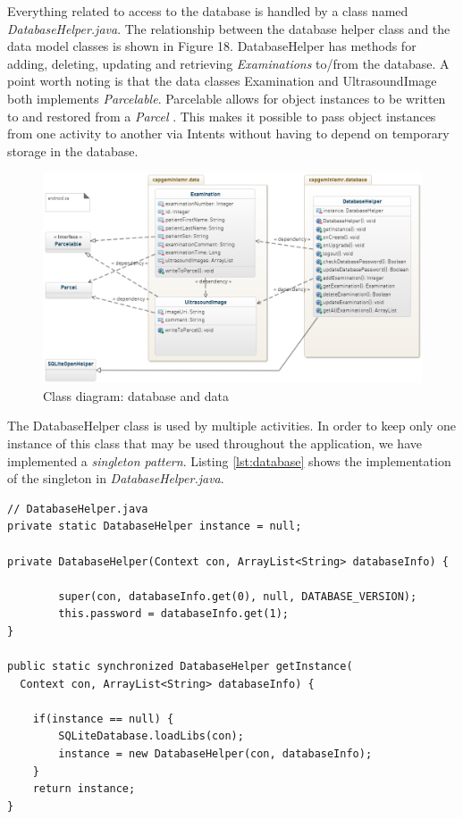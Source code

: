 \noindent
Everything related to access to the database is handled by a class named \emph{DatabaseHelper.java}. The relationship between the database helper class and the data model classes is shown in Figure 18. DatabaseHelper has methods for adding, deleting, updating and retrieving \emph{Examinations} to/from the database. A point worth noting is that the data classes Examination and UltrasoundImage both implements \emph{Parcelable}. Parcelable allows for object instances to be written to and restored from a \emph{Parcel} \cite{parcelable}. This makes it possible to pass object instances from one activity to another via Intents without having to depend on temporary storage in the database. 

\begin{figure}
    \centering
    \label{fig:classdiagram_db_data}
        \includegraphics[scale=0.75]{img/classdiagram1.png}
        \caption{Class diagram: database and data}
\end{figure}


\newpage
\noindent
The DatabaseHelper class is used by multiple activities. In order to keep only one instance of this class that may be used throughout the application, we have implemented a \emph{singleton pattern}. Listing \ref{lst:database} shows the implementation of the singleton in \emph{DatabaseHelper.java}.

\begin{lstlisting}[caption={Singleton implementation}, label={lst:database}]
// DatabaseHelper.java
private static DatabaseHelper instance = null;

private DatabaseHelper(Context con, ArrayList<String> databaseInfo) {

        super(con, databaseInfo.get(0), null, DATABASE_VERSION);
        this.password = databaseInfo.get(1);
}

public static synchronized DatabaseHelper getInstance(
  Context con, ArrayList<String> databaseInfo) {

    if(instance == null) {
        SQLiteDatabase.loadLibs(con);
        instance = new DatabaseHelper(con, databaseInfo);
    }
    return instance;
}
\end{lstlisting}

